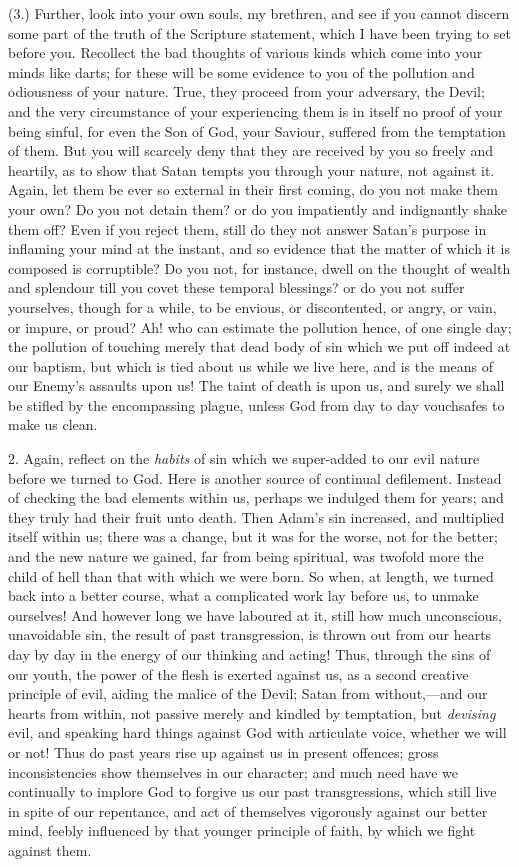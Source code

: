 (3.) Further, look into your own souls, my brethren,
and see if you cannot discern some part of the truth of
the Scripture statement, which I have been trying to set
before you. Recollect the bad thoughts of various kinds
which come into your minds like darts; for these will be
some evidence to you of the pollution and odiousness of
your nature. True, they proceed from your adversary, the
Devil; and the very circumstance of your experiencing
them is in itself no proof of your being sinful, for even
the Son of God, your Saviour, suffered from the
temptation of them. But you will scarcely deny that they
are received by you so freely and heartily, as to show
that Satan tempts you through your nature, not against
it. Again, let them be ever so external in their first
coming, do you not make them your own? Do you not detain
them? or do you impatiently and indignantly shake them
off? Even if you reject them, still do they not answer
Satan's purpose in inflaming your mind at the instant,
and so evidence that the matter of which it is composed
is corruptible? Do you not, for instance, dwell on the
thought of wealth and splendour till you covet these
temporal blessings? or do you not suffer yourselves,
though for a while, to be envious, or discontented, or
angry, or vain, or impure, or proud? Ah! who can estimate
the pollution hence, of one single day; the pollution of
touching merely that dead body of sin which we put off
indeed at our baptism, but which is tied about us while
we live here, and is the means of our Enemy's assaults
upon us! The taint of death is upon us, and surely we
shall be stifled by the encompassing plague, unless God
from day to day vouchsafes to make us clean.

2. Again, reflect on the \emph{habits} of sin which we
super-added to our evil nature before we turned to God.
Here is another source of continual defilement. Instead
of checking the bad elements within us, perhaps we
indulged them for years; and they truly had their fruit
unto death. Then Adam's sin increased, and multiplied
itself within us; there was a change, but it was for the
worse, not for the better; and the new nature we gained,
far from being spiritual, was twofold more the child of
hell than that with which we were born. So when, at
length, we turned back into a better course, what a
complicated work lay before us, to unmake ourselves! And
however long we have laboured at it, still how much
unconscious, unavoidable sin, the result of past
transgression, is thrown out from our hearts day by day
in the energy of our thinking and acting! Thus, through
the sins of our youth, the power of the flesh is exerted
against us, as a second creative principle of evil,
aiding the malice of the Devil; Satan from
without,—and our hearts from within, not passive
merely and kindled by temptation, but \emph{devising}
evil, and speaking hard things against God with
articulate voice, whether we will or not! Thus do past
years rise up against us in present offences; gross
inconsistencies show themselves in our character; and
much need have we continually to implore God to forgive
us our past transgressions, which still live in spite of
our repentance, and act of themselves vigorously against
our better mind, feebly influenced by that younger
principle of faith, by which we fight against them.

